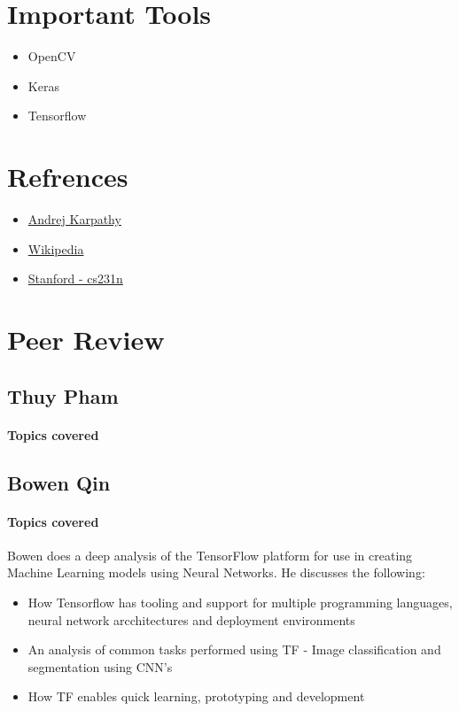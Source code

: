 \documentclass{article}
\begin{document}

	\section{Important Tools}
	\begin{itemize}
		\item OpenCV
		\item Keras
		\item Tensorflow
	\end{itemize}
	
	\section{Refrences}
		\begin{itemize}
			\item \href{https://www.youtube.com/watch?v=u6aEYuemt0M\&t=524s}{Andrej Karpathy}
			\item \href{https://en.wikipedia.org/wiki/Computer_vision}{Wikipedia}
			\item \href{https://cs231n.github.io/}{Stanford - cs231n}
		\end{itemize}
	
	
	\section{Peer Review}
		\subsection{Thuy Pham}
			\paragraph{Topics covered}

		\subsection{Bowen Qin}
			\paragraph{Topics covered}
			Bowen does a deep analysis of the TensorFlow platform for use in creating Machine Learning models using Neural Networks. He discusses the following:
			\begin{itemize}
				\item How Tensorflow has tooling and support for multiple programming languages, neural network arcchitectures and deployment environments
				\item An analysis of common tasks performed using TF - Image classification and segmentation using CNN's
				\item How TF enables quick learning, prototyping and development
			\end{itemize}
\end{document}
